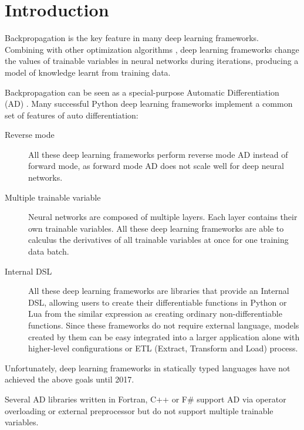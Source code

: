 \section{Introduction \label{introduction}}

Backpropagation \cite{rumelhart1985learning} is the key feature in many deep learning frameworks. Combining with other optimization algorithms \cite{kingma2014adam, zeiler2012adadelta,duchi2011adaptive}, deep learning frameworks change the values of trainable variables in neural networks during iterations, producing a model of knowledge learnt from training data.

Backpropagation can be seen as a special-purpose Automatic Differentiation (AD) \cite{baydin2015automatic}. Many successful Python deep learning frameworks \cite{tokui2015chainer,google2017eager,paszke2017pytorch,neubig2017dynet} implement a common set of features of auto differentiation:

\begin{description}

  \item[Reverse mode] All these deep learning frameworks perform reverse mode AD instead of forward mode, as forward mode AD does not scale well for deep neural networks.

  \item[Multiple trainable variable] Neural networks are composed of multiple layers. Each layer contains their own trainable variables. All these deep learning frameworks are able to calculus the derivatives of all trainable variables at once for one training data batch.

  \item[Internal DSL \cite{fowler2010domain}] All these deep learning frameworks are libraries that provide an Internal DSL, allowing users to create their differentiable functions in Python or Lua from the similar expression as creating ordinary non-differentiable functions. Since these frameworks do not require external language, models created by them can be easy integrated into a larger application alone with higher-level configurations \cite{chollet2015keras} or ETL (Extract, Transform and Load) process.

\end{description}

Unfortunately, deep learning frameworks in statically typed languages have not achieved the above goals until 2017.

Several AD libraries \cite{bischof1992adifor,griewank1996algorithm,TapenadeRef13,baydin2015diffsharp} written in Fortran, C++ or F\# support AD via operator overloading or external preprocessor but do not support multiple trainable variables.

